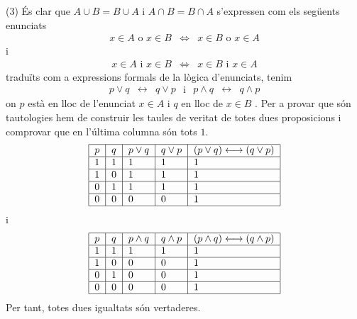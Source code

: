 \begin{solucio}
(3) És clar que $A\cup B=B\cup A$ i $A\cap B=B\cap A$ s'expressen com
els següents enunciats%
\begin{equation*}
\begin{array}{ccc}
x\in A\text{ o }x\in B & \Longleftrightarrow & x\in B\text{ o }x\in A%
\end{array}%
\end{equation*}%
i%
\begin{equation*}
\begin{array}{ccc}
x\in A\text{ i }x\in B & \Longleftrightarrow & x\in B\text{ i }x\in A%
\end{array}%
\end{equation*}%
traduïts com a expressions formals de la lògica d'enunciats, tenim%
\begin{equation*}
\begin{array}{ccc}
p\vee q & \longleftrightarrow & q\vee p%
\end{array}%
\text{ \ \ i \ \ }%
\begin{array}{ccc}
p\wedge q & \longleftrightarrow & q\wedge p%
\end{array}%
\end{equation*}%
on $p$ està en lloc de l'enunciat $x\in A$ i $q$ en lloc de $x\in B$ .
Per a provar que són tautologies hem de construir les taules de veritat
de totes dues proposicions i comprovar que en l'última columna són
tots $1$.%
\begin{equation*}
\begin{tabular}{|l|l|l|l|l|}
\hline
$p$ & $q$ & $p\vee q$ & $q\vee p$ & $(p\vee q)\longleftrightarrow (q\vee p)$
\\ \hline
$1$ & $1$ & $1$ & $1$ & $1$ \\ \hline
$1$ & $0$ & $1$ & $1$ & $1$ \\ \hline
$0$ & $1$ & $1$ & $1$ & $1$ \\ \hline
$0$ & $0$ & $0$ & $0$ & $1$ \\ \hline
\end{tabular}%
\end{equation*}%
i%
\begin{equation*}
\begin{tabular}{|l|l|l|l|l|}
\hline
$p$ & $q$ & $p\wedge q$ & $q\wedge p$ & $(p\wedge q)\longleftrightarrow
(q\wedge p)$ \\ \hline
$1$ & $1$ & $1$ & $1$ & $1$ \\ \hline
$1$ & $0$ & $0$ & $0$ & $1$ \\ \hline
$0$ & $1$ & $0$ & $0$ & $1$ \\ \hline
$0$ & $0$ & $0$ & $0$ & $1$ \\ \hline
\end{tabular}%
\end{equation*}%
Per tant, totes dues igualtats són vertaderes.


\end{solucio}
